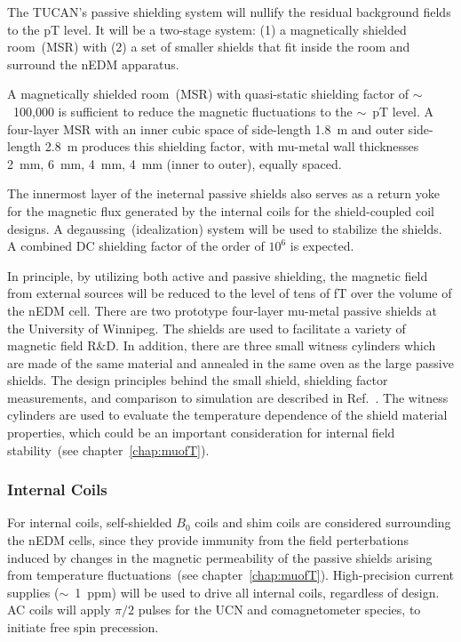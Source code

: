 The TUCAN's passive shielding system will nullify the residual
background fields to the pT level. It will be a two-stage system: (1)
a magnetically shielded room~(MSR) with (2) a set of smaller shields
that fit inside the room and surround the nEDM apparatus.

A magnetically shielded room~(MSR) with quasi-static
shielding factor of $\sim$~100,000 is sufficient to reduce the magnetic
fluctuations to the $\sim$~pT level. A four-layer MSR with an inner
cubic space of side-length 1.8~m and outer side-length 2.8~m produces
this shielding factor, with mu-metal wall thicknesses 2~mm, 6~mm,
4~mm, 4~mm (inner to outer), equally spaced.


The innermost layer of the ineternal passive shields also serves as a
return yoke for the magnetic flux generated by the internal coils for
the shield-coupled coil designs. A degaussing~(idealization) system
will be used to stabilize the shields. A combined DC shielding factor
of the order of $10^6$ is expected.


In principle, by utilizing both active and passive shielding, the
magnetic field from external sources will be reduced to the level of
tens of fT over the volume of the nEDM cell.  There are two prototype
four-layer mu-metal passive shields at the University of Winnipeg. The
shields are used to facilitate a variety of magnetic field R\&D. In
addition, there are three small witness cylinders which are made of
the same material and annealed in the same oven as the large passive
shields. The design principles behind the small shield, shielding
factor measurements, and comparison to simulation are described in
Ref.~\cite{martin2015large}.  The witness cylinders are used to
evaluate the temperature dependence of the shield material properties,
which could be an important consideration for internal field
stability~(see chapter~\ref{chap:muofT}).


\subsubsection{Internal Coils}
For internal coils, self-shielded $B_0$ coils and shim coils are
considered surrounding the nEDM cells, since they provide immunity
from the field perterbations induced by changes in the magnetic
permeability of the passive shields arising from temperature
fluctuations~(see chapter~\ref{chap:muofT}).  High-precision current
supplies ($\sim$~1~ppm) will be used to drive all internal coils,
regardless of design. AC coils will apply $\pi/2$ pulses for the UCN
and comagnetometer species, to initiate free spin precession.

